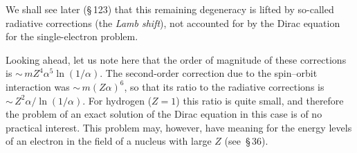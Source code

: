 We shall see later (\S\,123) that this remaining degeneracy is lifted by so-called radiative corrections (the \textit{Lamb shift}), not accounted for by the Dirac equation for the single-electron problem.

Looking ahead, let us note here that the order of magnitude of these corrections is ${\sim}\,mZ^4\alpha^5\ln(1/\alpha)$. The second-order correction due to the spin--orbit interaction was ${\sim}\,m(Z\alpha)^6$, so that its ratio to the radiative corrections is ${\sim}\,Z^2\alpha/\ln(1/\alpha)$. For hydrogen ($Z = 1$) this ratio is quite small, and therefore the problem of an exact solution of the Dirac equation in this case is of no practical interest. This problem may, however, have meaning for the energy levels of an electron in the field of a nucleus with large $Z$ (see~\S\,36).
